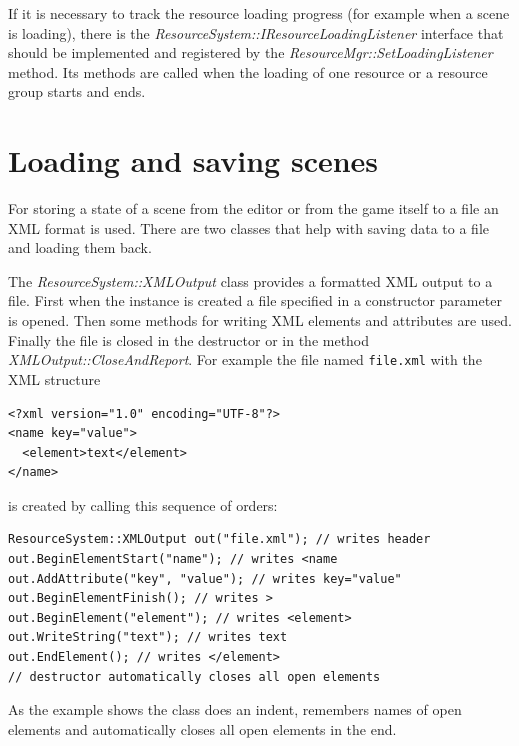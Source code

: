 \documentclass[a4paper, 12pt]{report}
\begin{document}
If it is necessary to track the resource loading progress (for example when a scene is loading), there is the \emph{ResourceSystem::IResourceLoadingListener} interface that should be implemented and registered by the \emph{ResourceMgr\-::\-Set\-Loading\-Listener} method. Its methods are called when the loading of one resource or a resource group starts and ends.

\section{Loading and saving scenes}

For storing a state of a scene from the editor or from the game itself to a file an XML format is used. There are two classes that help with saving data to a file and loading them back.

The \emph{ResourceSystem::XMLOutput} class provides a formatted XML output to a file. First when the instance is created a file specified in a constructor parameter is opened. Then some methods for writing XML elements and attributes are used. Finally the file is closed in the destructor or in the method \emph{XMLOutput::CloseAndReport}. For example the file named \verb/file.xml/ with the XML structure

\begin{verbatim}
<?xml version="1.0" encoding="UTF-8"?>
<name key="value">
  <element>text</element>
</name>
\end{verbatim}

\noindent is created by calling this sequence of orders:

\begin{verbatim}
ResourceSystem::XMLOutput out("file.xml"); // writes header
out.BeginElementStart("name"); // writes <name
out.AddAttribute("key", "value"); // writes key="value"
out.BeginElementFinish(); // writes >
out.BeginElement("element"); // writes <element>
out.WriteString("text"); // writes text
out.EndElement(); // writes </element>
// destructor automatically closes all open elements
\end{verbatim}

\noindent As the example shows the class does an indent, remembers names of open elements and automatically closes all open elements in the end.
\end{document}
